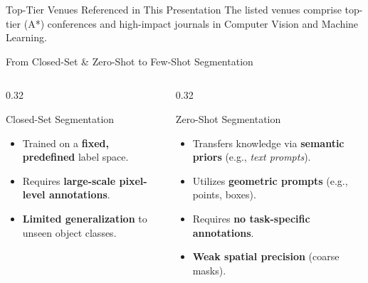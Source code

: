 \documentclass[aspectratio=169, 10pt]{beamer}
\begin{document}
\begin{frame}{Top-Tier Venues Referenced in This Presentation}
\vspace{0.3cm}
\centering
\footnotesize The listed venues comprise top-tier (A*) conferences and high-impact journals in Computer Vision and Machine Learning.
\end{frame}

\begin{frame}{From Closed-Set \& Zero-Shot to Few-Shot Segmentation}
    \begin{columns}[T]
        \begin{column}{0.32\textwidth}
            \begin{alertblock}{Closed-Set Segmentation}
                \begin{itemize}
                    \item Trained on a \textbf{fixed, predefined} label space.
                    \item Requires \textbf{large-scale pixel-level annotations}.
                    \item \textbf{Limited generalization} to unseen object classes.
                \end{itemize}
            \end{alertblock}
        \end{column}

        \begin{column}{0.32\textwidth}
            \begin{block}{Zero-Shot Segmentation}
                \begin{itemize}
                    \item Transfers knowledge via \textbf{semantic priors} (e.g., \textit{text prompts}).
                    \item Utilizes \textbf{geometric prompts} (e.g., points, boxes).
                    \item Requires \textbf{no task-specific annotations}.
                    \item \textbf{Weak spatial precision} (coarse masks).
                \end{itemize}
            \end{block}
        \end{column}
        

\end{columns}
\end{frame}
\end{document}
